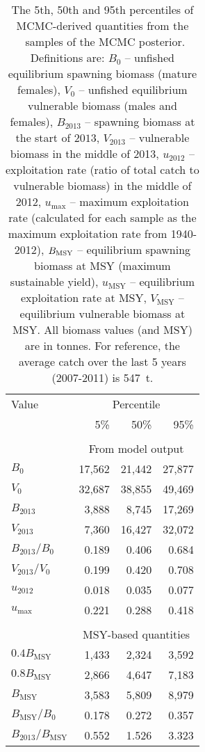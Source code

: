 \clearpage



\begin{table}[tp]
\centering
\caption{\label{tab:MCMCderived} The 5th, 50th and 95th percentiles of MCMC-derived quantities from the \numMCMC~samples of the MCMC posterior. Definitions are: $B_0$ -- unfished equilibrium spawning biomass (mature females), $V_0$ -- unfished equilibrium vulnerable biomass (males and females), $B_{2013}$ -- spawning biomass at the start of $2013$, $V_{2013}$ -- vulnerable biomass in the middle of 2013, $u_{2012}$ -- exploitation rate (ratio of total catch to vulnerable biomass) in the middle of 2012, $u_\mathrm{max}$ -- maximum exploitation rate (calculated for each sample as the maximum exploitation rate from 1940-2012), $B_\mathrm{MSY}$ -- equilibrium spawning biomass at MSY (maximum sustainable yield), $u_\mathrm{MSY}$ -- equilibrium exploitation rate at MSY, $V_\mathrm{MSY}$ -- equilibrium vulnerable biomass at MSY. All biomass values (and MSY) are in tonnes. For reference, the average catch over the last 5 years (2007-2011) is 547~t.}
\begin{tabular}{lrrr} 
\hline
Value & \multicolumn{3}{c}{Percentile}\\
\cline{2-4}
 & 5\% & 50\% & 95\% \\
\hline 
 & & & \\
& \multicolumn{3}{c}{From model output}\\
$B_0$                  & 17,562 & 21,442 & 27,877 \\
$V_0$                  & 32,687 & 38,855 & 49,469 \\
$B_{2013}$             & 3,888 & 8,745 & 17,269 \\
$V_{2013}$             & 7,360 & 16,427 & 32,072 \\

$B_{2013} / B_0$       & 0.189 & 0.406 & 0.684 \\
$V_{2013} / V_0$     & 0.199 & 0.420 & 0.708 \\

$u_{2012}$             & 0.018 & 0.035 & 0.077 \\
$u_\mathrm{max}$       & 0.221 & 0.288 & 0.418 \\
\hline
 & & & \\
& \multicolumn{3}{c}{MSY-based quantities}\\
$0.4 B_\mathrm{MSY}$   &  1,433 & 2,324 & 3,592 \\
$0.8 B_\mathrm{MSY}$   &  2,866 & 4,647 & 7,183 \\
$B_\mathrm{MSY}$       &  3,583 & 5,809 & 8,979 \\
$B_\mathrm{MSY} / B_0$ &  0.178 & 0.272 & 0.357 \\
$B_{2013} / B_\mathrm{MSY}$ & 0.552 & 1.526 & 3.323 \\


\end{tabular}
\end{table}
